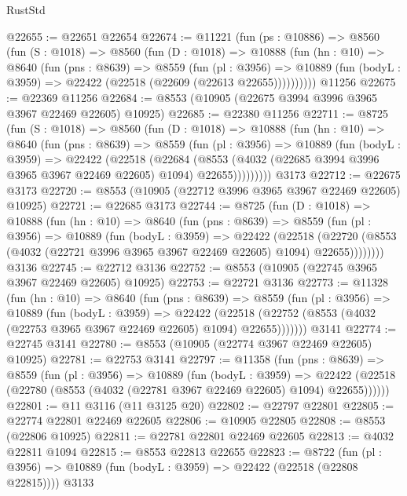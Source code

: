 \begin{lexlean}{RustStd}
\begin{coremodule}
@22655 := @22651 @22654
@22674 := @11221
    (fun (ps : @10886) =>
    @8560
      (fun (S : @1018) =>
      @8560
        (fun (D : @1018) =>
        @10888
          (fun (hn : @10) =>
          @8640
            (fun (pns : @8639) =>
            @8559
              (fun (pl : @3956) =>
              @10889 (fun (bodyL : @3959) => @22422 (@22518 (@22609 (@22613 @22655))))))))))
    @11256
@22675 := @22369 @11256
@22684 := @8553 (@10905 (@22675 @3994 @3996 @3965 @3967 @22469 @22605) @10925)
@22685 := @22380 @11256
@22711 := @8725
    (fun (S : @1018) =>
    @8560
      (fun (D : @1018) =>
      @10888
        (fun (hn : @10) =>
        @8640
          (fun (pns : @8639) =>
          @8559
            (fun (pl : @3956) =>
            @10889
              (fun (bodyL : @3959) =>
              @22422
                (@22518
                  (@22684
                    (@8553
                      (@4032 (@22685 @3994 @3996 @3965 @3967 @22469 @22605) @1094)
                      @22655)))))))))
    @3173
@22712 := @22675 @3173
@22720 := @8553 (@10905 (@22712 @3996 @3965 @3967 @22469 @22605) @10925)
@22721 := @22685 @3173
@22744 := @8725
    (fun (D : @1018) =>
    @10888
      (fun (hn : @10) =>
      @8640
        (fun (pns : @8639) =>
        @8559
          (fun (pl : @3956) =>
          @10889
            (fun (bodyL : @3959) =>
            @22422
              (@22518
                (@22720 (@8553 (@4032 (@22721 @3996 @3965 @3967 @22469 @22605) @1094) @22655))))))))
    @3136
@22745 := @22712 @3136
@22752 := @8553 (@10905 (@22745 @3965 @3967 @22469 @22605) @10925)
@22753 := @22721 @3136
@22773 := @11328
    (fun (hn : @10) =>
    @8640
      (fun (pns : @8639) =>
      @8559
        (fun (pl : @3956) =>
        @10889
          (fun (bodyL : @3959) =>
          @22422
            (@22518 (@22752 (@8553 (@4032 (@22753 @3965 @3967 @22469 @22605) @1094) @22655)))))))
    @3141
@22774 := @22745 @3141
@22780 := @8553 (@10905 (@22774 @3967 @22469 @22605) @10925)
@22781 := @22753 @3141
@22797 := @11358
    (fun (pns : @8639) =>
    @8559
      (fun (pl : @3956) =>
      @10889
        (fun (bodyL : @3959) =>
        @22422 (@22518 (@22780 (@8553 (@4032 (@22781 @3967 @22469 @22605) @1094) @22655))))))
@22801 := @11 @3116 (@11 @3125 @20)
@22802 := @22797 @22801
@22805 := @22774 @22801 @22469 @22605
@22806 := @10905 @22805
@22808 := @8553 (@22806 @10925)
@22811 := @22781 @22801 @22469 @22605
@22813 := @4032 @22811 @1094
@22815 := @8553 @22813 @22655
@22823 := @8722
    (fun (pl : @3956) => @10889 (fun (bodyL : @3959) => @22422 (@22518 (@22808 @22815))))
    @3133

\end{coremodule}
\end{lexlean}

